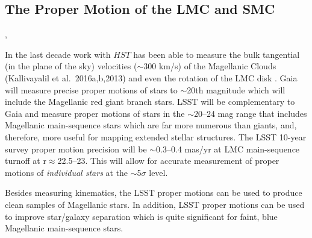 %
%

\subsection{The Proper Motion of the LMC and SMC}
\def\secname{\chpname:propermotion}\label{sec:\secname}

,

In the last decade work with $HST$ has been able to measure the bulk
tangential (in the plane of the sky) velocities ($\sim$300 km/s) of
the Magellanic Clouds (Kallivayalil et al.\ 2016a,b,2013) and even the
rotation of the LMC disk \citep{2014ApJ...781..121V}. Gaia
will measure precise proper motions of stars to $\sim$20th magnitude
which will include the Magellanic red giant branch stars. LSST will be
complementary to Gaia and measure proper motions of stars in the
$\sim$20--24 mag range that includes Magellanic main-sequence stars
which are far more numerous than giants, and, therefore, more useful
for mapping extended stellar structures. The LSST 10-year survey
proper motion precision will be $\sim$0.3--0.4 mas/yr at LMC
main-sequence turnoff at r$\approx$22.5--23.  This will allow for
accurate measurement of proper motions of {\em individual stars} at the
$\sim$5$\sigma$ level.

Besides measuring kinematics, the LSST proper motions can be used to
produce clean samples of Magellanic stars.
%
In addition, LSST proper motions can be used to improve star/galaxy
separation which is quite significant for faint, blue Magellanic
main-sequence stars.



%
%

